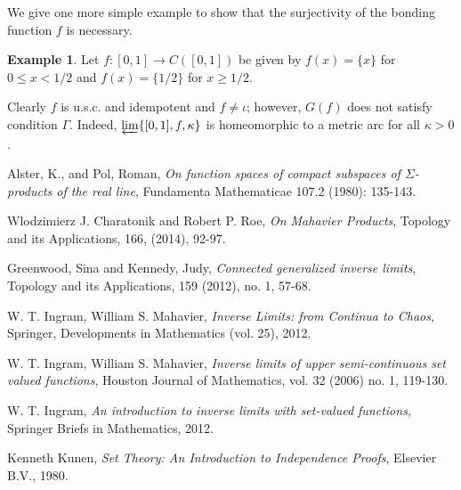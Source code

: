 \documentclass{amsart}
\theoremstyle{definition}
\newtheorem{example}[theorem]{Example}
\begin{document}
We give one more simple example to show that the surjectivity of the bonding function $f$ is necessary.

\begin{example} \label{ex2} Let $f: [0,1] \rightarrow C([0,1])$ be given by $f(x) = \{x\}$ for $0 \le x < 1/2$ and $f(x) = \{1/2\}$ for $x \ge 1/2$.
\end{example}

Clearly $f$ is u.s.c. and idempotent and $f \ne \iota$; however, $G(f)$ does not satisfy condition $\Gamma$. Indeed, $\varprojlim \{ [0,1], f, \kappa \}$ is homeomorphic to a metric arc for all $\kappa > 0$.


\begin{thebibliography}{10}

\smallskip

 Alster, K., and Pol, Roman, \textit{On function spaces of compact subspaces of $\Sigma$-products of the real line}, Fundamenta Mathematicae 107.2 (1980): 135-143.

\smallskip

 Wlodzimierz J. Charatonik and Robert P. Roe, {\it On Mahavier Products}, Topology and its Applications,
166, (2014), 92-97.

\smallskip

 Greenwood, Sina and Kennedy, Judy, {\it Connected generalized inverse limits}, Topology and its Applications,
159 (2012), no. 1, 57-68.

\smallskip

 W. T. Ingram, William S. Mahavier, {\it Inverse Limits: from Continua to Chaos}, Springer, Developments in Mathematics (vol. 25), 2012.

\smallskip

 W. T. Ingram, William S. Mahavier, {\it Inverse limits of upper semi-continuous set valued functions}, Houston Journal of Mathematics, vol. 32 (2006) no. 1, 119-130.

\smallskip

 W. T. Ingram, {\it An introduction to inverse limits with set-valued functions}, Springer Briefs in Mathematics, 2012.

\smallskip

 Kenneth Kunen, {\it Set Theory: An Introduction to Independence Proofs}, Elsevier B.V., 1980.

\smallskip


\end{thebibliography}
\end{document}
